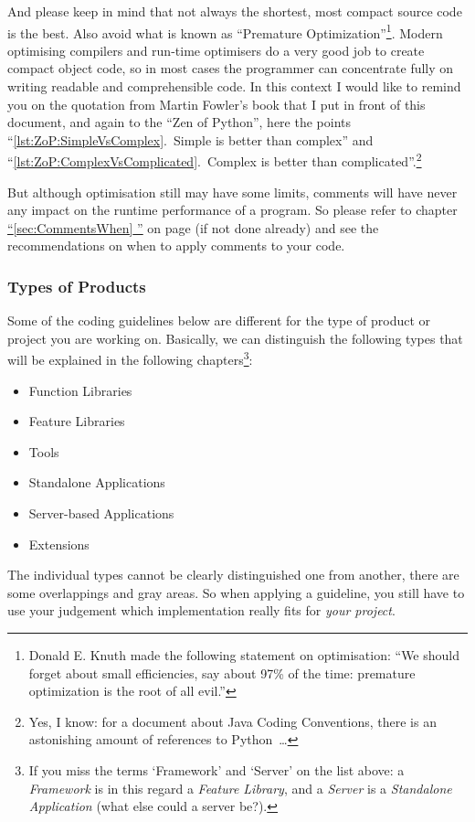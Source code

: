 \documentclass[11pt,a4paper, titlepage, parskip=half, headsepline, footsepline, cleardoublepage=current, headheight=1cm]{scrbook}
\newcommand*{\tqfullvref}[1]{\hyperref[{#1}]{“\ref*{#1} \nameref*{#1}”} on page \pageref{#1}}
\begin{document}
And please keep in mind that not always the shortest, most compact source code is the best. Also avoid what is known as “Premature Optimization”\footnote{Donald E. Knuth made the following statement on optimisation: “We should forget about small efficiencies, say about 97\% of the time: premature optimization is the root of all evil.”\autocite{Knuth:PrematureOptimization}}. Modern optimising compilers and run-time optimisers do a very good job to create compact object code, so in most cases the programmer can concentrate fully on writing readable and comprehensible code. In this context I would like to remind you on the quotation from Martin Fowler's book that I put in front of this document, and again to the “Zen of Python”, here the points “\ref{lst:ZoP:SimpleVsComplex}.~Simple is better than complex” and “\ref{lst:ZoP:ComplexVsComplicated}.~Complex is better than complicated”.\footnote{Yes, I know: for a document about Java Coding Conventions, there is an astonishing amount of references to Python~…}

But although optimisation still may have some limits, comments will have never any impact on the runtime performance of a program. So please refer to chapter \tqfullvref{sec:CommentsWhen} (if not done already) and see the recommendations on when to apply comments to your code.

\subsubsection{Types of Products}\label{sec:TypesOfProducts}
Some of the coding guidelines below are different for the type of product or project you are working on. Basically, we can distinguish the following types that will be explained in the following chapters\footnote{If you miss the terms ‘Framework’ and ‘Server’ on the list above: a \textit{Framework} is in this regard a \textit{Feature Library}, and a \textit{Server} is a \textit{Standalone Application} (what else could a server be?).}:
\begin{itemize}[nosep]
\item{Function Libraries}
\item{Feature Libraries}
\item{Tools}
\item{Standalone Applications}
\item{Server-based Applications}
\item{Extensions}
\end{itemize}
The individual types cannot be clearly distinguished one from another, there are some overlappings and gray areas. So when applying a guideline, you still have to use your judgement which implementation really fits for \textit{your project}.
\end{document}
